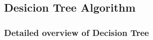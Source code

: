 \documentclass{beamer}
\begin{document}
\subsection{Desicion Tree Algorithm}
\begin{frame}
	\frametitle{Detailed overview of Decision Tree}
    \begin{figure}

    \end{figure}
    \end{frame}
\end{document}
